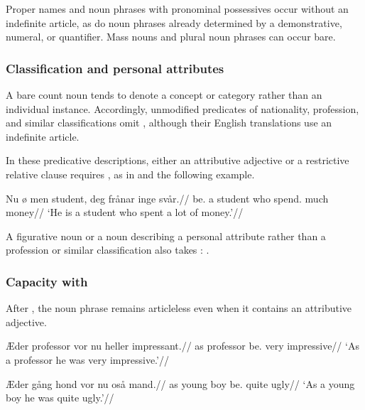 \pex
\a {}
\a {}
\a {}
\xe

Proper names and noun phrases with pronominal possessives occur without an indefinite article, as do noun phrases already determined by a demonstrative, numeral, or quantifier. Mass nouns and plural noun phrases can occur bare.

\subsubsection{Classification and personal attributes}
\label{sec:article-classification}

A bare count noun tends to denote a concept or category rather than an individual instance. Accordingly, unmodified predicates of nationality, profession, and similar classifications omit , although their English translations use an indefinite article.

\pex
\a {}
\a {}
\a {}
\xe

In these predicative descriptions, either an attributive adjective or a restrictive relative clause requires , as in  and the following example.

\pex
\begingl
\gla Nu ø men student, deg frånar inge svår.//
\glb \Third{}\Sg{} be.\Pres{} a student who spend.\Pst{} much money//
\glft `He is a student who spent a lot of money.'//
\endgl
\xe

A figurative noun or a noun describing a personal attribute rather than a profession or similar classification also takes : .

\subsubsection{Capacity with }
\label{sec:article-capacity}

After , the noun phrase remains articleless even when it contains an attributive adjective.

\pex
\begingl
\gla Æder professor vor nu heller impressant.//
\glb as professor be.\Pst{} \Third{}\Sg{} very impressive//
\glft `As a professor he was very impressive.'//
\endgl
\xe

\pex
\begingl
\gla Æder gång hond vor nu oså mand.//
\glb as young boy be.\Pst{} \Third{}\Sg{} quite ugly//
\glft `As a young boy he was quite ugly.'//
\endgl
\xe

